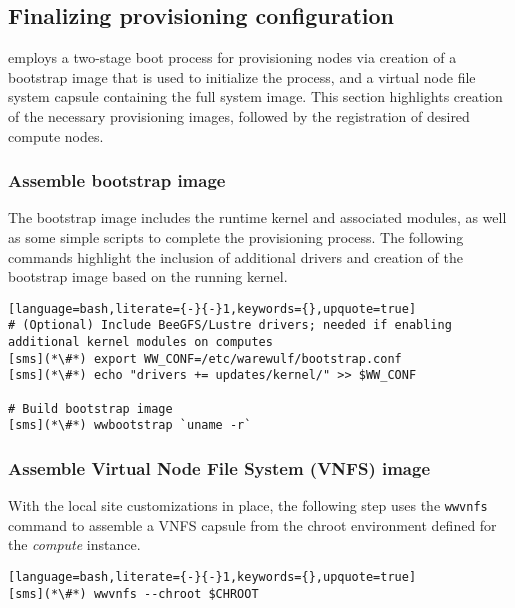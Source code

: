 \subsection{Finalizing provisioning configuration} \label{sec:assemble_bootstrap}

\Warewulf{} employs a two-stage boot process for provisioning nodes via
creation of a bootstrap image that is used to initialize the process, and a virtual node
file system capsule containing the full system image. This section highlights
creation of the necessary provisioning images, followed by the registration of
desired compute nodes.

\subsubsection{Assemble bootstrap image}

The bootstrap image includes the runtime kernel and associated modules, as well
as some simple scripts to complete the provisioning process. The
following commands highlight the inclusion of additional drivers and creation
of the bootstrap image based on the running kernel.

\begin{lstlisting}[language=bash,literate={-}{-}1,keywords={},upquote=true]
# (Optional) Include BeeGFS/Lustre drivers; needed if enabling additional kernel modules on computes
[sms](*\#*) export WW_CONF=/etc/warewulf/bootstrap.conf
[sms](*\#*) echo "drivers += updates/kernel/" >> $WW_CONF

# Build bootstrap image
[sms](*\#*) wwbootstrap `uname -r`
\end{lstlisting}

\subsubsection{Assemble Virtual Node File System (VNFS) image}

With the local site customizations in place, the following step uses the
\texttt{wwvnfs} command to assemble a VNFS capsule from the chroot environment
defined for the {\em compute} instance. 

\begin{lstlisting}[language=bash,literate={-}{-}1,keywords={},upquote=true]
[sms](*\#*) wwvnfs --chroot $CHROOT
\end{lstlisting}


